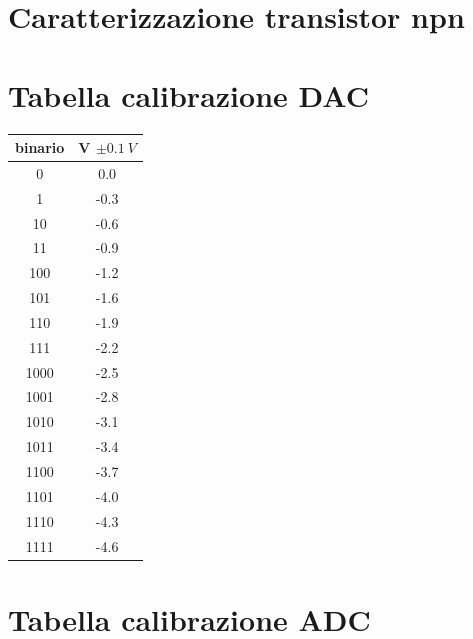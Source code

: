 \documentclass[journal]{IEEEtran}
\begin{document}
\clearpage

\begin{appendices}

\section{Caratterizzazione transistor npn}

\section{Tabella calibrazione DAC}

\centering
\begin{tabular}{cc}
binario & V $ \pm 0.1 \ V $ \\ \hline
0       & 0.0                          \\
1       & -0.3                       \\
10      & -0.6                       \\
11      & -0.9                       \\
100     & -1.2                       \\
101     & -1.6                       \\
110     & -1.9                       \\
111     & -2.2                       \\
1000    & -2.5                       \\
1001    & -2.8                       \\
1010    & -3.1                       \\
1011    & -3.4                       \\
1100    & -3.7                       \\
1101    & -4.0                       \\
1110    & -4.3                       \\
1111    & -4.6
\vspace{5 mm}
\label{tab:calibrazione_dac}
\end{tabular}


\section{Tabella calibrazione ADC}


\end{appendices}
\end{document}
